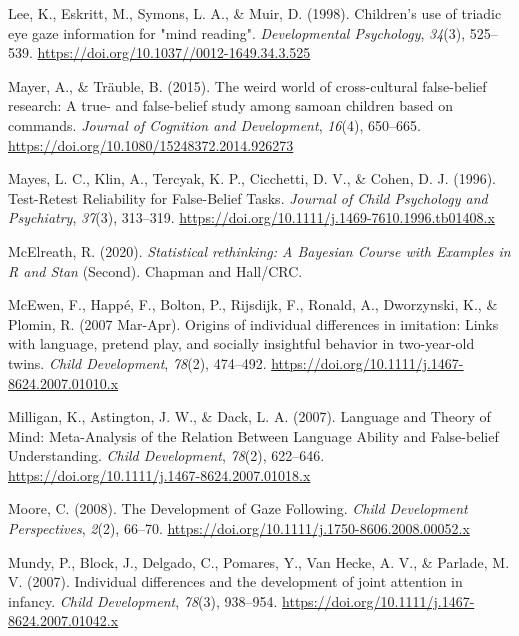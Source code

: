 \documentclass[
  man,floatsintext]{apa6}
\newlength{\cslhangindent}
\newlength{\cslentryspacingunit} %
\newenvironment{CSLReferences}[2] %
 {%
  \setlength{\parindent}{0pt}
  \ifodd #1
  \let\oldpar\par
  \def\par{\hangindent=\cslhangindent\oldpar}
  \fi
  \setlength{\parskip}{#2\cslentryspacingunit}
 }%
 {}
\begin{document}
\begin{CSLReferences}{1}{0}
\leavevmode{}%
Lee, K., Eskritt, M., Symons, L. A., \& Muir, D. (1998). Children's use of triadic eye gaze information for "mind reading". \emph{Developmental Psychology}, \emph{34}(3), 525--539. \url{https://doi.org/10.1037//0012-1649.34.3.525}

\leavevmode{}%
Mayer, A., \& Träuble, B. (2015). The weird world of cross-cultural false-belief research: {A} true- and false-belief study among samoan children based on commands. \emph{Journal of Cognition and Development}, \emph{16}(4), 650--665. \url{https://doi.org/10.1080/15248372.2014.926273}

\leavevmode{}%
Mayes, L. C., Klin, A., Tercyak, K. P., Cicchetti, D. V., \& Cohen, D. J. (1996). Test-{Retest Reliability} for {False-Belief Tasks}. \emph{Journal of Child Psychology and Psychiatry}, \emph{37}(3), 313--319. \url{https://doi.org/10.1111/j.1469-7610.1996.tb01408.x}

\leavevmode{}%
McElreath, R. (2020). \emph{Statistical rethinking: {A Bayesian Course} with {Examples} in {R} and {Stan}} (Second). {Chapman and Hall/CRC}.

\leavevmode{}%
McEwen, F., Happé, F., Bolton, P., Rijsdijk, F., Ronald, A., Dworzynski, K., \& Plomin, R. (2007 Mar-Apr). Origins of individual differences in imitation: Links with language, pretend play, and socially insightful behavior in two-year-old twins. \emph{Child Development}, \emph{78}(2), 474--492. \url{https://doi.org/10.1111/j.1467-8624.2007.01010.x}

\leavevmode{}%
Milligan, K., Astington, J. W., \& Dack, L. A. (2007). Language and {Theory} of {Mind}: {Meta-Analysis} of the {Relation Between Language Ability} and {False-belief Understanding}. \emph{Child Development}, \emph{78}(2), 622--646. \url{https://doi.org/10.1111/j.1467-8624.2007.01018.x}

\leavevmode{}%
Moore, C. (2008). The {Development} of {Gaze Following}. \emph{Child Development Perspectives}, \emph{2}(2), 66--70. \url{https://doi.org/10.1111/j.1750-8606.2008.00052.x}

\leavevmode{}%
Mundy, P., Block, J., Delgado, C., Pomares, Y., Van Hecke, A. V., \& Parlade, M. V. (2007). Individual differences and the development of joint attention in infancy. \emph{Child Development}, \emph{78}(3), 938--954. \url{https://doi.org/10.1111/j.1467-8624.2007.01042.x}


\end{CSLReferences}
\end{document}
